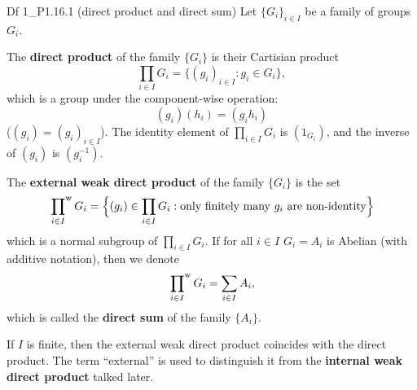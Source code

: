 \documentclass{article}
\newcommand{\wprod}[1]{\sideset{}{^\text{w}}\prod_{#1}}
\begin{document}
\begin{Df}{Df 1\_P1.16.1 (direct product and direct sum)}
    Let $\{G_i\}_{i\in I}$ be a family of groups $G_i$.
    \begin{compactenum}
        \item The \textbf{direct product} of the family $\{G_i\}$ is their Cartisian product
        $$ \prod_{i\in I} G_i = \{(g_i)_{i\in I}: g_i \in G_i\}, $$
        \textcolor{Th}{which is a group under the component-wise operation:
        $$ (g_i) (h_i) = (g_ih_i) $$}
        ($(g_i) = (g_i)_{i\in I}$). \textcolor{Th}{The identity element of $\prod_{i\in I} G_i$ is $(1_{G_i})$, and the inverse of $(g_i)$ is $(g_i^{-1})$.}
        \item The \textbf{external weak direct product} of the family $\{G_i\}$ is the set
        $$ \wprod{i\in I} G_i = \Big\{(g_i)\in \prod_{i\in I} G_i: \text{only finitely many } g_i \text{ are non-identity}\Big\} $$
        \textcolor{Th}{which is a normal subgroup of $\prod_{i\in I} G_i$.} If for all $i\in I$ $G_i = A_i$ is Abelian (with additive notation), then we denote
        $$ \wprod{i\in I} G_i = \sum_{i\in I} A_i, $$
        which is called the \textbf{direct sum} of the family $\{A_i\}$.
    \end{compactenum}
\end{Df}

\begin{Rmk}{}
    \textcolor{Th}{If $I$ is finite, then the external weak direct product coincides with the direct product.} The term ``external'' is used to distinguish it from the \textbf{internal weak direct product} talked later.
\end{Rmk}
\end{document}

